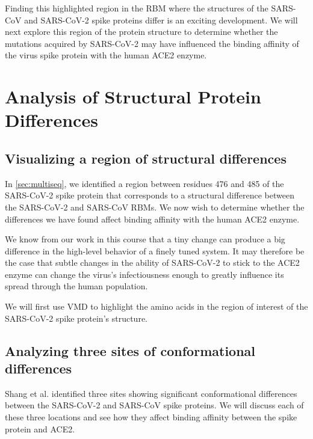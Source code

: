 Finding this highlighted region in the RBM where the structures of the SARS-CoV and SARS-CoV-2 spike proteins differ is an exciting development. We will next explore this region of the protein structure to determine whether the mutations acquired by SARS-CoV-2 may have influenced the binding affinity of the virus spike protein with the human ACE2 enzyme.\\

\FloatBarrier
{}

\section{Analysis of Structural Protein Differences}
\label{sec:structural_differences}
\subsection{Visualizing a region of structural differences}

In \autoref{sec:multiseq}, we identified a region between residues 476 and 485 of the SARS-CoV-2 spike protein that corresponds to a structural difference between the SARS-CoV-2 and SARS-CoV RBMs. We now wish to determine whether the differences we have found affect binding affinity with the human ACE2 enzyme.

We know from our work in this course that a tiny change can produce a big difference in the high-level behavior of a finely tuned system. It may therefore be the case that subtle changes in the ability of SARS-CoV-2 to stick to the ACE2 enzyme can change the virus's infectiousness enough to greatly influence its spread through the human population.

We will first use VMD to highlight the amino acids in the region of interest of the SARS-CoV-2 spike protein's structure. 

\FloatBarrier
{}
\subsection{Analyzing three sites of conformational differences}

Shang et al. identified three sites showing significant conformational differences between the SARS-CoV-2 and SARS-CoV spike proteins. We will discuss each of these three locations and see how they affect binding affinity between the spike protein and ACE2.

